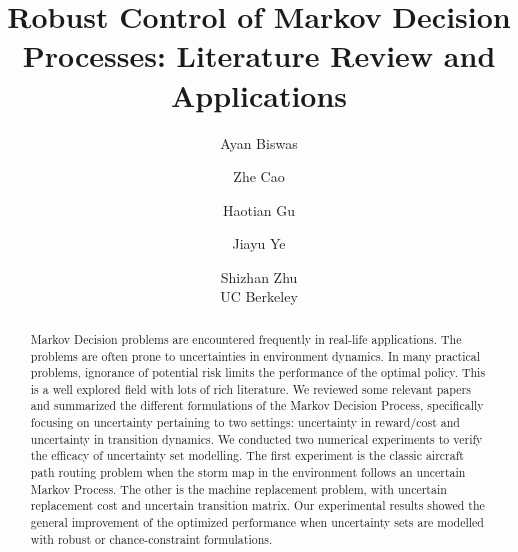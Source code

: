 \documentclass[11pt,reqno]{amsart}
\theoremstyle{definition}
\numberwithin{equation}{section}
\theoremstyle{remark}
\begin{document}
\title[Robust Control of Markov Decision Process]{Robust Control of Markov Decision Processes: Literature Review and Applications}
\author[A. Biswas \and Z. Cao \and H. Gu \and J. Ye \and S. Zhu]{Ayan Biswas \and Zhe Cao \and Haotian Gu \and Jiayu Ye \and Shizhan Zhu\\UC Berkeley}
\maketitle
\vspace{-15pt}
\begin{abstract}

Markov Decision problems are encountered frequently in real-life applications. The problems are often prone to uncertainties in environment dynamics. In many practical problems, ignorance of potential risk limits the performance of the optimal policy. This is a well explored field with lots of rich literature. We reviewed some relevant papers and summarized the different formulations of the Markov Decision Process, specifically focusing on uncertainty pertaining to two settings: uncertainty in reward/cost and uncertainty in transition dynamics. We conducted two numerical experiments to verify the efficacy of uncertainty set modelling. The first experiment is the classic aircraft path routing problem when the storm map in the environment follows an uncertain Markov Process. The other is the machine replacement problem, with uncertain replacement cost and uncertain transition matrix. Our experimental results showed the general improvement of the optimized performance when uncertainty sets are modelled with robust or chance-constraint formulations. 
\end{abstract}
\end{document}
